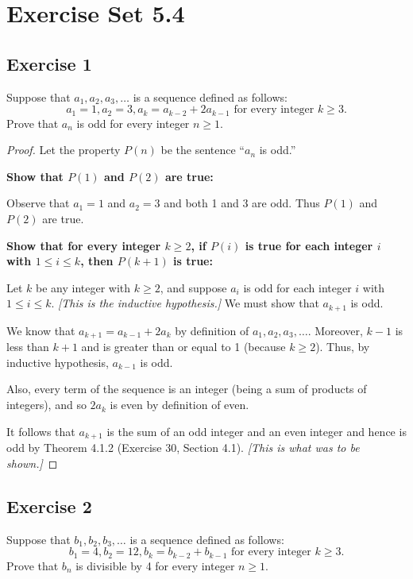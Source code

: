 \documentclass[14pt]{extarticle}
\begin{document}
\section{Exercise Set 5.4}

\subsection{Exercise 1}
Suppose that $a_1, a_2, a_3, \ldots$ is a sequence defined
as follows:
\[
    a_1 = 1, a_2 = 3, a_k = a_{k-2} + 2a_{k-1} \text{ for every integer $k \geq 3$.}
\]
Prove that $a_n$ is odd for every integer $n \geq 1$.

\begin{proof}
    Let the property $P(n)$ be the sentence “$a_n$ is odd.”

    {\bf Show that $P(1)$ and $P(2)$ are true:}

    Observe that $a_1 = 1$ and $a_2 = 3$ and both 1 and 3 are odd. Thus $P(1)$ and $P(2)$ are true.

        {\bf Show that for every integer $k \geq 2$, if $P(i)$ is true for each integer $i$ with $1 \leq i \leq k$, then $P(k + 1)$ is true:}

    Let $k$ be any integer with $k \geq 2$, and suppose $a_i$ is odd for each integer $i$ with $1 \leq i \leq k$. {\it [This is the inductive hypothesis.]} We must show that $a_{k+1}$ is odd.

    We know that $a_{k+1} = a_{k-1} + 2a_k$ by definition of $a_1, a_2, a_3, \ldots$. Moreover, $k - 1$ is less than $k + 1$ and is greater than or equal to 1 (because $k \geq 2$). Thus, by inductive hypothesis, $a_{k-1}$ is odd.

    Also, every term of the sequence is an integer (being a sum of products of integers), and so $2a_k$ is even by definition of even.

    It follows that $a_{k+1}$ is the sum of an odd integer and an even integer and hence is odd by Theorem 4.1.2 (Exercise 30, Section 4.1). {\it [This is what was to be shown.]}
\end{proof}

\subsection{Exercise 2}
Suppose that $b_1, b_2, b_3, \ldots$ is a sequence defined
as follows:
\[
    b_1 = 4, b_2 = 12, b_k = b_{k-2} + b_{k-1} \text{ for every integer $k \geq 3$.}
\]
Prove that $b_n$ is divisible by 4 for every integer $n \geq 1$.
\end{document}
